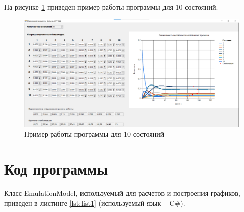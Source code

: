 \documentclass[14pt, a4paper]{extarticle}
\begin{document}
\newpage
На рисунке \ref{pic:4} приведен пример работы программы для 10 состояний.
\begin{figure}[h]
	\begin{center}
		{\includegraphics[scale=0.45]{pictures/4.png}
			\caption{Пример работы программы для 10 состояний}
			\label{pic:4}}
	\end{center}
\end{figure}



\section{Код программы}

Класс EmulationModel, используемый для расчетов и построения графиков, приведен в листинге \ref{lst:list1} (используемый язык -- C\#).
\end{document}
